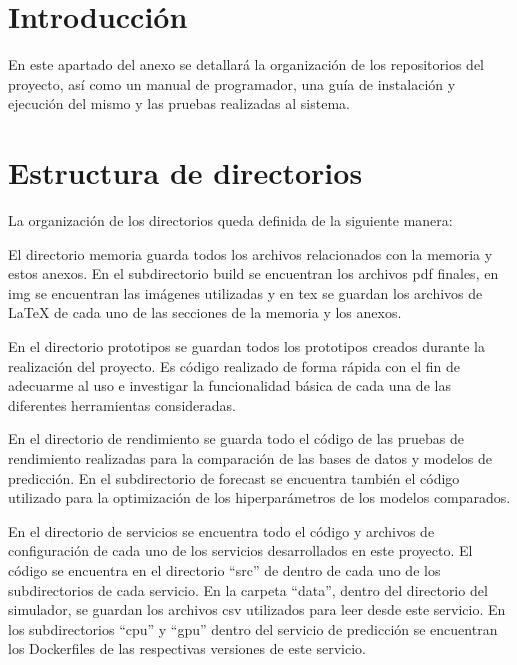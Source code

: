 
\section{Introducción}

En este apartado del anexo se detallará la organización de los repositorios del proyecto, así
como un manual de programador, una guía de instalación y ejecución del mismo y las pruebas realizadas
al sistema.

\section{Estructura de directorios}

La organización de los directorios queda definida de la siguiente manera:


El directorio memoria guarda todos los archivos relacionados con la memoria y estos anexos. En 
el subdirectorio build se encuentran los archivos pdf finales, en img se encuentran las imágenes 
utilizadas y en tex se guardan los archivos de LaTeX de cada uno de las secciones de la memoria y 
los anexos.


En el directorio prototipos se guardan todos los prototipos creados durante la realización del 
proyecto. Es código realizado de forma rápida con el fin de adecuarme al uso e investigar la funcionalidad
básica de cada una de las diferentes herramientas consideradas.


En el directorio de rendimiento se guarda todo el código de las pruebas de rendimiento realizadas 
para la comparación de las bases de datos y modelos de predicción. En el subdirectorio de 
forecast se encuentra también el código utilizado para la optimización de los hiperparámetros de 
los modelos comparados.


En el directorio de servicios se encuentra todo el código y archivos de configuración de cada 
uno de los servicios desarrollados en este proyecto. El código se encuentra en el directorio
``src'' de dentro de cada uno de los subdirectorios de cada servicio. En la carpeta ``data'',
dentro del directorio del simulador, se guardan los archivos csv utilizados para leer desde 
este servicio. En los subdirectorios ``cpu'' y ``gpu'' dentro del servicio de predicción se 
encuentran los Dockerfiles de las respectivas versiones de este servicio.

